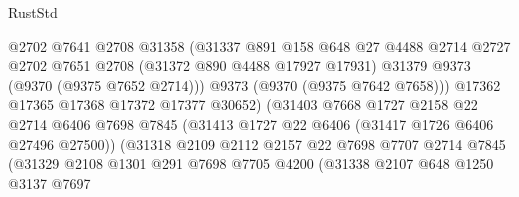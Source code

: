 \begin{lexlean}{RustStd}
\begin{coremodule}
                                    @2702
                                    @7641
                                    @2708
                                    @31358
                                    (@31337
                                      @891
                                      @158
                                      @648
                                      @27
                                      @4488
                                      @2714
                                      @2727
                                      @2702
                                      @7651
                                      @2708
                                      (@31372 @890 @4488 @17927 @17931)
                                      @31379
                                      @9373
                                      (@9370 (@9375 @7652 @2714)))
                                    @9373
                                    (@9370 (@9375 @7642 @7658)))
                                  @17362
                                  @17365
                                  @17368
                                  @17372
                                  @17377
                                  @30652)
                                (@31403
                                  @7668
                                  @1727
                                  @2158
                                  @22
                                  @2714
                                  @6406
                                  @7698
                                  @7845
                                  (@31413 @1727 @22 @6406 (@31417 @1726 @6406 @27496 @27500))
                                  (@31318
                                    @2109
                                    @2112
                                    @2157
                                    @22
                                    @7698
                                    @7707
                                    @2714
                                    @7845
                                    (@31329
                                      @2108
                                      @1301
                                      @291
                                      @7698
                                      @7705
                                      @4200
                                      (@31338
                                        @2107
                                        @648
                                        @1250
                                        @3137
                                        @7697

\end{coremodule}
\end{lexlean}
